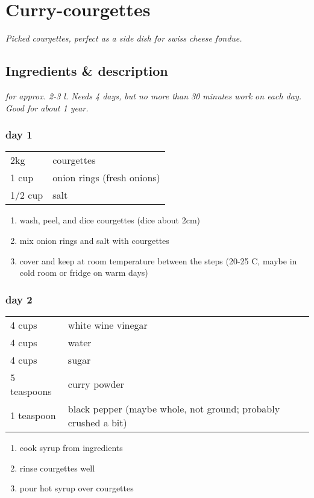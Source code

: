 \section{Curry-courgettes}
\textit{Picked courgettes, perfect as a side dish for swiss cheese fondue.}

\subsection*{Ingredients \& description}
\textit{for approx. 2-3 l. Needs 4 days, but no more than 30 minutes work on each day. Good for about 1 year.}

\subsubsection*{day 1}
\begin{tabular}{ l l }
  2kg & courgettes\\
  1 cup & onion rings (fresh onions) \\
  1/2 cup & salt \\
\end{tabular}
\begin{enumerate}
  \item wash, peel, and dice courgettes (dice about 2cm)
  \item mix onion rings and salt with courgettes
  \item cover and keep at room temperature between the steps (20-25 C, maybe in cold room or fridge on warm days)
\end{enumerate}

\subsubsection*{day 2}
\begin{tabular}{ l l }
  4 cups & white wine vinegar\\
  4 cups & water\\
  4 cups & sugar\\
  5 teaspoons & curry powder\\
  1 teaspoon & black pepper (maybe whole, not ground; probably crushed a bit)\\
\end{tabular}
\begin{enumerate}
  \item cook syrup from ingredients
  \item rinse courgettes well
  \item pour hot syrup over courgettes
\end{enumerate}

